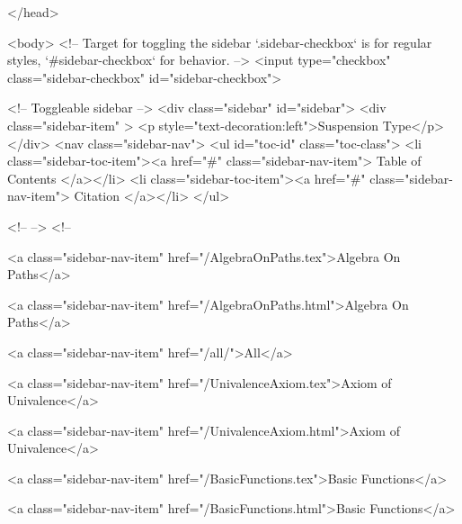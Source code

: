   
</head>




  <body>
    <!-- Target for toggling the sidebar `.sidebar-checkbox` is for regular
     styles, `#sidebar-checkbox` for behavior. -->
<input type="checkbox" class="sidebar-checkbox" id="sidebar-checkbox">

<!-- Toggleable sidebar -->
<div class="sidebar" id="sidebar">
  <div class="sidebar-item" >
    <p style="text-decoration:left">Suspension Type</p>
  </div>
  <nav class="sidebar-nav">
    <ul id="toc-id" class="toc-class">
  <li class="sidebar-toc-item"><a href="#" class="sidebar-nav-item"> Table of Contents </a></li>
  <li class="sidebar-toc-item"><a href="#" class="sidebar-nav-item"> Citation </a></li>
</ul>


    <!--  -->
    <!-- 
      
    
      
    
      
    
      
        
      
    
      
        
          <a class="sidebar-nav-item" href="/AlgebraOnPaths.tex">Algebra On Paths</a>
        
      
    
      
        
          <a class="sidebar-nav-item" href="/AlgebraOnPaths.html">Algebra On Paths</a>
        
      
    
      
        
          <a class="sidebar-nav-item" href="/all/">All</a>
        
      
    
      
        
          <a class="sidebar-nav-item" href="/UnivalenceAxiom.tex">Axiom of Univalence</a>
        
      
    
      
        
          <a class="sidebar-nav-item" href="/UnivalenceAxiom.html">Axiom of Univalence</a>
        
      
    
      
        
          <a class="sidebar-nav-item" href="/BasicFunctions.tex">Basic Functions</a>
        
      
    
      
        
          <a class="sidebar-nav-item" href="/BasicFunctions.html">Basic Functions</a>
        
